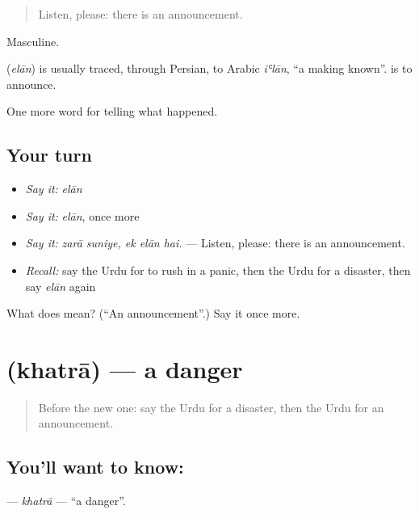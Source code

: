 \begin{quote}
Listen, please: there is an announcement.
\end{quote}

Masculine.

\begin{cousinweb}
\textbf{} (\emph{elān}) is usually traced, through Persian, to Arabic \emph{iʿlān}, \textquotedblleft{}a making known\textquotedblright{}. \textbf{ } is to announce.
\end{cousinweb}

\begin{grammarlens}[title={What you've built}]
One more word for telling what happened.
\end{grammarlens}

\subsection*{Your turn}
\begin{itemize}
\raggedright
  \item \emph{Say it:} \emph{elān}
  \item \emph{Say it:} \emph{elān}, once more
  \item \emph{Say it:} \emph{zarā suniye, ek elān hai.} — Listen, please: there is an announcement.
  \item \emph{Recall:} say the Urdu for to rush in a panic, then the Urdu for a disaster, then say \emph{elān} again
\end{itemize}

\begin{tcolorbox}[breakable,colback=teal!4,colframe=teal!35!black,title={Before you move on}]
What does  mean? (\textquotedblleft{}An announcement\textquotedblright{}.) Say it once more.
\end{tcolorbox}
\section[\texorpdfstring{\ur{خطرہ} (khatrā)}{خطرہ (khatrā)}]{ (khatrā) — a danger}

\label{lesson:UR-C290-khatra}



\begin{quote}
Before the new one: say the Urdu for a disaster, then the Urdu for an announcement.
\end{quote}

\subsection*{You'll want to know: }
\textbf{} — \emph{khatrā} — \textquotedblleft{}a danger\textquotedblright{}.

